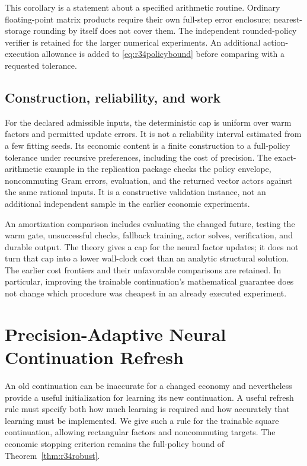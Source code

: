 \documentclass[ecta,nameyear,draft]{econsocart}
\theoremstyle{definition}
\theoremstyle{remark}
\begin{document}
This corollary is a statement about a specified arithmetic routine. Ordinary
floating-point matrix products require their own full-step error enclosure;
nearest-storage rounding by itself does not cover them. The independent
rounded-policy verifier is retained for the larger numerical experiments.
An additional action-execution allowance is added to
\eqref{eq:r34policybound} before comparing with a requested tolerance.

\subsection{Construction, reliability, and work}
For the declared admissible inputs, the deterministic cap is uniform over
warm factors and permitted update errors. It is not a reliability interval
estimated from a few fitting seeds. Its economic content is a finite
construction to a full-policy tolerance under recursive preferences,
including the cost of precision. The exact-arithmetic example in the
replication package checks the policy envelope, noncommuting Gram errors,
evaluation, and the returned vector actors against the same rational inputs.
It is a constructive validation instance, not an additional independent
sample in the earlier economic experiments.

An amortization comparison includes evaluating the changed future, testing
the warm gate, unsuccessful checks, fallback training, actor solves,
verification, and durable output. The theory gives a cap for the neural
factor updates; it does not turn that cap into a lower wall-clock cost than
an analytic structural solution. The earlier cost frontiers and their
unfavorable comparisons are retained. In particular, improving the trainable
continuation's mathematical guarantee does not change which procedure was
cheapest in an already executed experiment.

\section{Precision-Adaptive Neural Continuation Refresh}
\label{sec:r37precision}
An old continuation can be inaccurate for a changed economy and nevertheless
provide a useful initialization for learning its new continuation. A useful
refresh rule must specify both how much learning is required and how accurately
that learning must be implemented. We give such a rule for the trainable
square continuation, allowing rectangular factors and noncommuting targets.
The economic stopping criterion remains the full-policy bound of
Theorem~\ref{thm:r34robust}.
\end{document}
